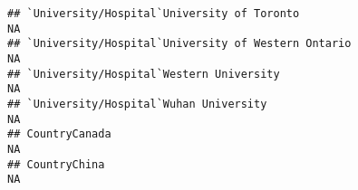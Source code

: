\documentclass[]{article}
\begin{document}
\begin{verbatim}
## `University/Hospital`University of Toronto                                                                                                                                                                                                                                                                                                                                                                                                                                            NA
## `University/Hospital`University of Western Ontario                                                                                                                                                                                                                                                                                                                                                                                                                                    NA
## `University/Hospital`Western University                                                                                                                                                                                                                                                                                                                                                                                                                                               NA
## `University/Hospital`Wuhan University                                                                                                                                                                                                                                                                                                                                                                                                                                                 NA
## CountryCanada                                                                                                                                                                                                                                                                                                                                                                                                                                                                         NA
## CountryChina                                                                                                                                                                                                                                                                                                                                                                                                                                                                          NA

\end{verbatim}
\end{document}
